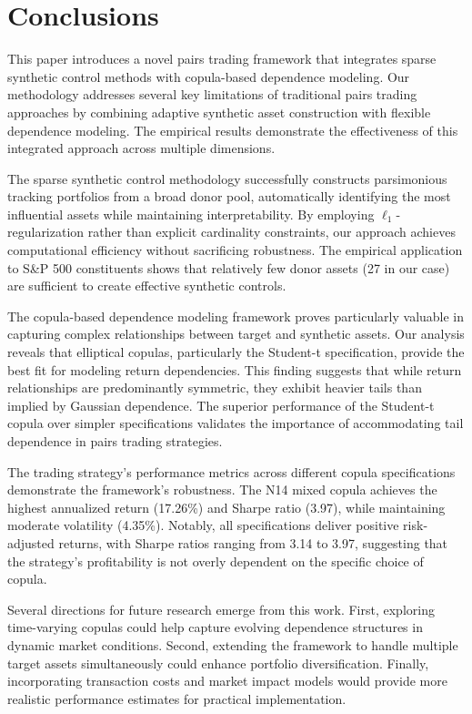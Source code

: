 \section{Conclusions} \label{sec:conclusion}

This paper introduces a novel pairs trading framework that integrates sparse synthetic control methods with copula-based dependence modeling. Our methodology addresses several key limitations of traditional pairs trading approaches by combining adaptive synthetic asset construction with flexible dependence modeling. The empirical results demonstrate the effectiveness of this integrated approach across multiple dimensions.

The sparse synthetic control methodology successfully constructs parsimonious tracking portfolios from a broad donor pool, automatically identifying the most influential assets while maintaining interpretability. By employing $\ell_1$-regularization rather than explicit cardinality constraints, our approach achieves computational efficiency without sacrificing robustness. The empirical application to S\&P 500 constituents shows that relatively few donor assets (27 in our case) are sufficient to create effective synthetic controls.

The copula-based dependence modeling framework proves particularly valuable in capturing complex relationships between target and synthetic assets. Our analysis reveals that elliptical copulas, particularly the Student-t specification, provide the best fit for modeling return dependencies. This finding suggests that while return relationships are predominantly symmetric, they exhibit heavier tails than implied by Gaussian dependence. The superior performance of the Student-t copula over simpler specifications validates the importance of accommodating tail dependence in pairs trading strategies.

The trading strategy's performance metrics across different copula specifications demonstrate the framework's robustness. The N14 mixed copula achieves the highest annualized return (17.26\%) and Sharpe ratio (3.97), while maintaining moderate volatility (4.35\%). Notably, all specifications deliver positive risk-adjusted returns, with Sharpe ratios ranging from 3.14 to 3.97, suggesting that the strategy's profitability is not overly dependent on the specific choice of copula.

Several directions for future research emerge from this work. First, exploring time-varying copulas could help capture evolving dependence structures in dynamic market conditions. Second, extending the framework to handle multiple target assets simultaneously could enhance portfolio diversification. Finally, incorporating transaction costs and market impact models would provide more realistic performance estimates for practical implementation.